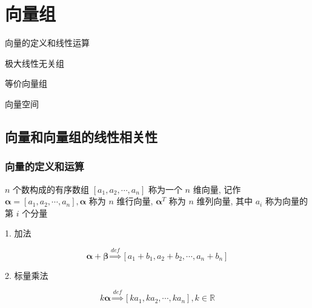 \chapter{向量组}
\begin{introduction}
	\item 向量的定义和线性运算
	\item 极大线性无关组
	\item 等价向量组
	\item 向量空间
\end{introduction}
\section{向量和向量组的线性相关性}

\subsection{向量的定义和运算}
\begin{definition}[向量的定义]
	$n$ 个数构成的有序数组 $[a_{1},a_{2},\cdots,a_{n}]$ 称为一个 $n$ 维向量, 记作 
	$\boldsymbol{\alpha} = [a_{1},a_{2},\cdots,a_{n}], \boldsymbol{\alpha}$ 称为 $n$ 维行向量,
	$\boldsymbol{\alpha}^{T}$ 称为 $n$ 维列向量, 其中 $a_{i}$ 称为向量的第 $i$ 个分量
\end{definition}
\begin{definition}[向量的线性运算]
	\textcolor{purpleb}{1. 加法}

	$$\boldsymbol{\alpha} + \boldsymbol{\beta} \overset{def}{\Longrightarrow}[a_{1}+b_{1},a_{2}+b_{2},\cdots,a_{n}+b_{n}]$$
	
	\textcolor{purpleb}{2. 标量乘法}

	$$k \boldsymbol{\alpha}\overset{def}{\Longrightarrow}[ka_{1},ka_{2},\cdots,ka_{n}], k\in \mathbb{R}$$
	
\end{definition}
